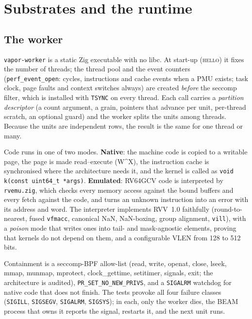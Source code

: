 \chapter{Substrates and the runtime}\label{ch:runtime}

\section{The worker}

\texttt{vapor-worker} is a static Zig executable with no libc. At start-up (\textsc{hello}) it fixes the
number of threads; the thread pool and the event counters (\texttt{perf\_event\_open}: cycles,
instructions and cache events when a PMU exists; task clock, page faults and context switches always)
are created \emph{before} the seccomp filter, which is installed with \texttt{TSYNC} on every thread.
Each call carries a \emph{partition descriptor} (a count argument, a grain, pointers that advance per
unit, per-thread scratch, an optional guard) and the worker splits the units among threads. Because the
units are independent rows, the result is the same for one thread or many.

Code runs in one of two modes. \textbf{Native}: the machine code is copied to a writable page, the page
is made read--execute (W\^{}X), the instruction cache is synchronised where the architecture needs it,
and the kernel is called as \texttt{void k(const uint64\_t *args)}. \textbf{Emulated}: RV64GCV code is
interpreted by \texttt{rvemu.zig}, which checks every memory access against the bound buffers and every
fetch against the code, and turns an unknown instruction into an error with its address and word. The
interpreter implements RVV~1.0 faithfully (round-to-nearest, fused \texttt{vfmacc}, canonical NaN,
NaN-boxing, group alignment, \texttt{vill}), with a \emph{poison} mode that writes ones into
tail- and mask-agnostic elements, proving that kernels do not depend on them, and a configurable VLEN
from 128 to 512 bits.

Containment is a seccomp-BPF allow-list (read, write, openat, close, lseek, mmap, munmap, mprotect,
clock\_gettime, setitimer, signals, exit; the architecture is audited),
\texttt{PR\_SET\_NO\_NEW\_PRIVS}, and a \texttt{SIGALRM} watchdog for native code that does not finish.
The tests provoke all four failure classes (\texttt{SIGILL}, \texttt{SIGSEGV}, \texttt{SIGALRM},
\texttt{SIGSYS}); in each, only the worker dies, the BEAM process that owns it reports the signal,
restarts it, and the next unit runs.

